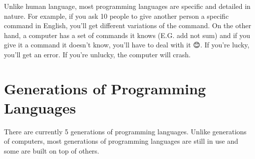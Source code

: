 \documentclass{book}
\begin{document}
Unlike human language, most programming languages are specific and detailed in nature. For example, if you ask 10 people to give another person a specific command in English, you'll get different variations of the command. On the other hand, a computer has a set of commands it knows (E.G. add not sum) and if you give it a command it doesn't know, you'll have to deal with it 😊. If you're lucky, you'll get an error. If you're unlucky, the computer will crash.

\section{Generations of Programming Languages}
There are currently 5 generations of programming languages. Unlike generations of computers, most generations of programming languages are still in use and some are built on top of others.
\end{document}
